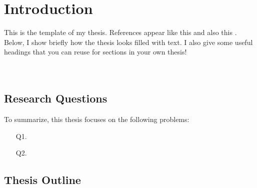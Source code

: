 \section{Introduction}

This is the template of my thesis. References appear like this \cite{mlp-universal} and also this \cite{rbf-universal}. Below, I show briefly how the thesis looks filled with text. I also give some useful headings that you can reuse for sections in your own thesis! \\

\lipsum[1] \\

\lipsum[2] \\

\lipsum[14]

\subsection{Research Questions}

To summarize, this thesis focuses on the following problems:


\begin{itemize}[leftmargin=0.85in]
    \item[Q1.  ] \lipsum[1][1] \\\lipsum[1][2]
    \item[Q2.  ] \lipsum[1][1] \\\lipsum[1][2]
\end{itemize}

\subsection{Thesis Outline}